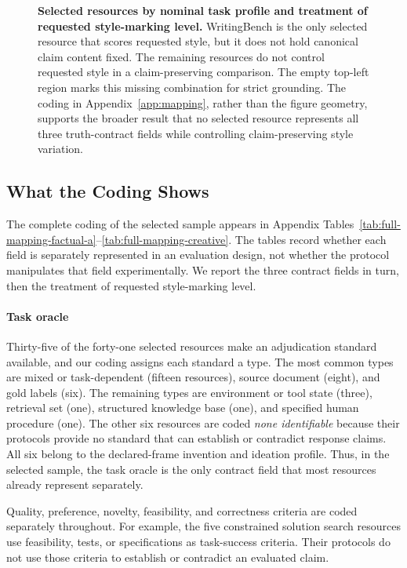 \documentclass{clv2025}
\begin{document}
\begin{figure}[!ht]
\caption{\textbf{Selected resources by nominal task profile and treatment of
requested style-marking level.}
WritingBench is the only selected resource that scores requested style, but it
does not hold canonical claim content fixed. The remaining resources do not
control requested style in a claim-preserving comparison. The empty top-left
region marks this missing combination for strict grounding. The coding in
Appendix~\ref{app:mapping}, rather than the figure geometry, supports the
broader result that no selected resource represents all three truth-contract
fields while controlling claim-preserving style variation.}
\label{fig:profiles}
\end{figure}
\FloatBarrier
\subsection{What the Coding Shows}\label{sec:mapping}

The complete coding of the selected sample appears in Appendix
Tables~\ref{tab:full-mapping-factual-a}--\ref{tab:full-mapping-creative}.
The tables record whether each field is separately represented in an evaluation
design, not whether the protocol manipulates that field experimentally.
We report the three contract fields in turn, then the treatment of requested
style-marking level.

\paragraph{Task oracle}
Thirty-five of the forty-one selected resources make an adjudication standard
available, and our coding assigns each standard a type.
The most common types are mixed or task-dependent (fifteen resources), source
document (eight), and gold labels (six).
The remaining types are environment or tool state (three), retrieval set (one),
structured knowledge base (one), and specified human procedure (one).
The other six resources are coded \emph{none identifiable} because their
protocols provide no standard that can establish or contradict response claims.
All six belong to the declared-frame invention and ideation profile.
Thus, in the selected sample, the task oracle is the only contract field that
most resources already represent separately.

Quality, preference, novelty, feasibility, and correctness criteria are coded
separately throughout.
For example, the five constrained solution search resources use feasibility,
tests, or specifications as task-success criteria. Their protocols do not use
those criteria to establish or contradict an evaluated claim.
\end{document}
